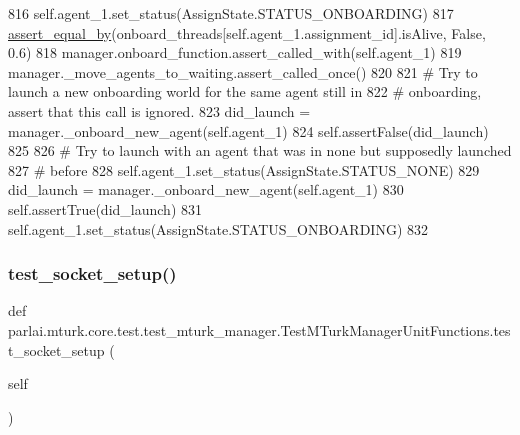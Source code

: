 \begin{DoxyCode}
816         self.agent\_1.set\_status(AssignState.STATUS\_ONBOARDING)
817         \hyperlink{namespaceparlai_1_1mturk_1_1core_1_1test_1_1test__mturk__manager_a1fd7ac4fedefa65d2416601107dbe44c}{assert\_equal\_by}(onboard\_threads[self.agent\_1.assignment\_id].isAlive, \textcolor{keyword}{False}, 0.6)
818         manager.onboard\_function.assert\_called\_with(self.agent\_1)
819         manager.\_move\_agents\_to\_waiting.assert\_called\_once()
820 
821         \textcolor{comment}{# Try to launch a new onboarding world for the same agent still in}
822         \textcolor{comment}{# onboarding, assert that this call is ignored.}
823         did\_launch = manager.\_onboard\_new\_agent(self.agent\_1)
824         self.assertFalse(did\_launch)
825 
826         \textcolor{comment}{# Try to launch with an agent that was in none but supposedly launched}
827         \textcolor{comment}{# before}
828         self.agent\_1.set\_status(AssignState.STATUS\_NONE)
829         did\_launch = manager.\_onboard\_new\_agent(self.agent\_1)
830         self.assertTrue(did\_launch)
831         self.agent\_1.set\_status(AssignState.STATUS\_ONBOARDING)
832 
\end{DoxyCode}
\mbox{\label{classparlai_1_1mturk_1_1core_1_1test_1_1test__mturk__manager_1_1TestMTurkManagerUnitFunctions_a7ceaedc34a74f15a15c1f655038af139}} 
\subsubsection{\texorpdfstring{test\+\_\+socket\+\_\+setup()}{test\_socket\_setup()}}
{\footnotesize\ttfamily def parlai.\+mturk.\+core.\+test.\+test\+\_\+mturk\+\_\+manager.\+Test\+M\+Turk\+Manager\+Unit\+Functions.\+test\+\_\+socket\+\_\+setup (\begin{DoxyParamCaption}\item[{}]{self }\end{DoxyParamCaption})}

